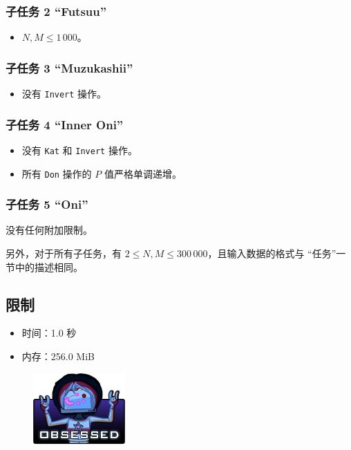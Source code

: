 \documentclass[UTF8, 11pt, a4paper]{article}
\begin{document}
\subsubsection*{子任务 2 “Futsuu”}
\begin{itemize}
    \item $N, M \leq 1\,000$。
\end{itemize}
\subsubsection*{子任务 3 “Muzukashii”}
\begin{itemize}
    \item 没有 \texttt{Invert} 操作。
\end{itemize}
\subsubsection*{子任务 4 “Inner Oni”}
\begin{itemize}
    \item 没有 \texttt{Kat} 和 \texttt{Invert} 操作。
    \item 所有 \texttt{Don} 操作的 $P$ 值严格单调递增。
\end{itemize}
\subsubsection*{子任务 5 “Oni”}
没有任何附加限制。

另外，对于所有子任务，有 $2 \leq N, M \leq 300\,000$，且输入数据的格式与%
“任务”一节中的描述相同。

\subsection*{限制}
\begin{itemize}
\item 时间：1.0 秒
\item 内存：256.0 MiB
\end{itemize}

\begin{figure}[h]\centering
\includegraphics[scale=0.55]{obsessed.png}
\end{figure}
\end{document}
